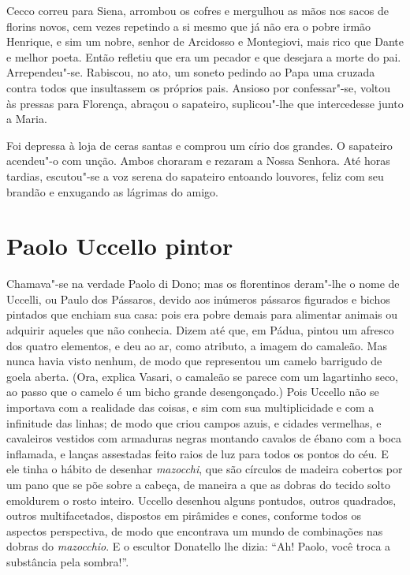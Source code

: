Cecco correu para Siena, arrombou os cofres e mergulhou as mãos nos sacos
de florins novos, cem vezes repetindo a si mesmo que já não era o pobre
irmão Henrique, e sim um nobre, senhor de Arcidosso e Montegiovi, mais
rico que Dante e melhor poeta. Então refletiu que era um pecador e que
desejara a morte do pai. Arrependeu"-se. Rabiscou, no ato, um soneto
pedindo ao Papa uma cruzada contra todos que insultassem os próprios pais.
Ansioso por confessar"-se, voltou às pressas para Florença, abraçou o
sapateiro, suplicou"-lhe que intercedesse junto a Maria.

Foi depressa à loja de ceras santas e comprou um círio dos grandes. O
sapateiro acendeu"-o com unção. Ambos choraram e rezaram a Nossa Senhora.
Até horas tardias, escutou"-se a voz serena do sapateiro entoando louvores,
feliz com seu brandão e enxugando as lágrimas do amigo.

\chapter{Paolo Uccello pintor}

Chamava"-se na verdade Paolo di Dono; mas os florentinos deram"-lhe o nome de
Uccelli, ou Paulo dos Pássaros, devido aos inúmeros pássaros figurados e
bichos pintados que enchiam sua casa: pois era pobre demais para alimentar
animais ou adquirir aqueles que não conhecia. Dizem até que, em Pádua,
pintou um afresco dos quatro elementos, e deu ao ar, como atributo, a
imagem do camaleão. Mas nunca havia visto nenhum, de modo que representou
um camelo barrigudo de goela aberta. (Ora, explica Vasari, o camaleão se
parece com um lagartinho seco, ao passo que o camelo é um bicho grande
desengonçado.) Pois Uccello não se importava com a realidade das coisas, e
sim com sua multiplicidade e com a infinitude das linhas; de modo que
criou campos azuis, e cidades vermelhas, e cavaleiros vestidos com
armaduras negras montando cavalos de ébano com a boca inflamada, e lanças
assestadas feito raios de luz para todos os pontos do céu. E ele tinha o
hábito de desenhar \textit{mazocchi}, que são círculos de madeira cobertos
por um pano que se põe sobre a cabeça, de maneira a que as dobras do
tecido solto emoldurem o rosto inteiro. Uccello desenhou alguns pontudos,
outros quadrados, outros multifacetados, dispostos em pirâmides e cones,
conforme todos os aspectos perspectiva, de modo que encontrava um mundo de
combinações nas dobras do \textit{mazocchio}. E o escultor Donatello lhe
dizia: “Ah! Paolo, você troca a substância pela sombra!”.

